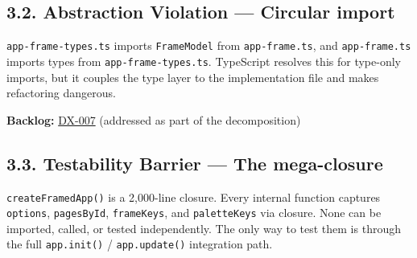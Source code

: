 \subsection{3.2. Abstraction Violation --- Circular import}\label{record-411-abstraction-violation-circular-import}

\texttt{a\allowbreak{}p\allowbreak{}p\allowbreak{}-\allowbreak{}f\allowbreak{}r\allowbreak{}a\allowbreak{}m\allowbreak{}e\allowbreak{}-\allowbreak{}t\allowbreak{}y\allowbreak{}p\allowbreak{}e\allowbreak{}s\allowbreak{}.\allowbreak{}t\allowbreak{}s} imports \texttt{F\allowbreak{}r\allowbreak{}a\allowbreak{}m\allowbreak{}e\allowbreak{}M\allowbreak{}o\allowbreak{}d\allowbreak{}e\allowbreak{}l} from \texttt{a\allowbreak{}p\allowbreak{}p\allowbreak{}-\allowbreak{}f\allowbreak{}r\allowbreak{}a\allowbreak{}m\allowbreak{}e\allowbreak{}.\allowbreak{}t\allowbreak{}s}, and \texttt{a\allowbreak{}p\allowbreak{}p\allowbreak{}-\allowbreak{}f\allowbreak{}r\allowbreak{}a\allowbreak{}m\allowbreak{}e\allowbreak{}.\allowbreak{}t\allowbreak{}s} imports types from \texttt{a\allowbreak{}p\allowbreak{}p\allowbreak{}-\allowbreak{}f\allowbreak{}r\allowbreak{}a\allowbreak{}m\allowbreak{}e\allowbreak{}-\allowbreak{}t\allowbreak{}y\allowbreak{}p\allowbreak{}e\allowbreak{}s\allowbreak{}.\allowbreak{}t\allowbreak{}s}. TypeScript resolves this for type-only imports, but it couples the type layer to the implementation file and makes refactoring dangerous.

\textbf{Backlog:} \href{https://github.com/flyingrobots/bijou/blob/cbd70612140e7a450d764b3c7be1c6af878b99bc/docs/method/graveyard/legacy-backlog/bad-code/DX-007-decompose-app-frame-mega-closure.md}{DX-007} (addressed as part of the decomposition)

\subsection{3.3. Testability Barrier --- The mega-closure}\label{record-411-testability-barrier-the-mega-closure}

\texttt{c\allowbreak{}r\allowbreak{}e\allowbreak{}a\allowbreak{}t\allowbreak{}e\allowbreak{}F\allowbreak{}r\allowbreak{}a\allowbreak{}m\allowbreak{}e\allowbreak{}d\allowbreak{}A\allowbreak{}p\allowbreak{}p\allowbreak{}(\allowbreak{})} is a 2,000-line closure. Every internal function captures \texttt{o\allowbreak{}p\allowbreak{}t\allowbreak{}i\allowbreak{}o\allowbreak{}n\allowbreak{}s}, \texttt{p\allowbreak{}a\allowbreak{}g\allowbreak{}e\allowbreak{}s\allowbreak{}B\allowbreak{}y\allowbreak{}I\allowbreak{}d}, \texttt{f\allowbreak{}r\allowbreak{}a\allowbreak{}m\allowbreak{}e\allowbreak{}K\allowbreak{}e\allowbreak{}y\allowbreak{}s}, and \texttt{p\allowbreak{}a\allowbreak{}l\allowbreak{}e\allowbreak{}t\allowbreak{}t\allowbreak{}e\allowbreak{}K\allowbreak{}e\allowbreak{}y\allowbreak{}s} via closure. None can be imported, called, or tested independently. The only way to test them is through the full \texttt{a\allowbreak{}p\allowbreak{}p\allowbreak{}.\allowbreak{}i\allowbreak{}n\allowbreak{}i\allowbreak{}t\allowbreak{}(\allowbreak{})} / \texttt{a\allowbreak{}p\allowbreak{}p\allowbreak{}.\allowbreak{}u\allowbreak{}p\allowbreak{}d\allowbreak{}a\allowbreak{}t\allowbreak{}e\allowbreak{}(\allowbreak{})} integration path.

